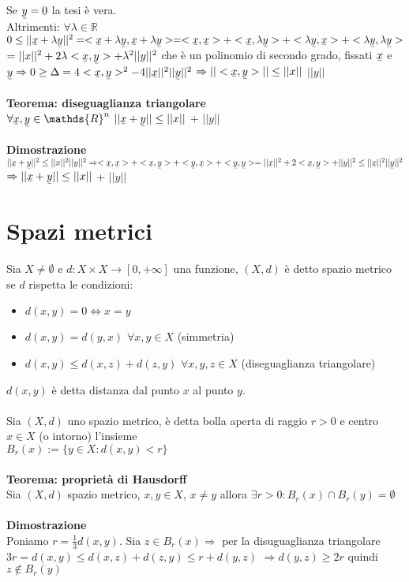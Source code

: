 \documentclass{article}
\newcommand\ubar[1]{\stackunder[1.2pt]{$#1$}{\rule{.8ex}{.075ex}}}
\begin{document}
Se $\ubar{y} = 0$ la tesi è vera.\\
Altrimenti: $\forall \lambda \in \mathds{R}$ \quad $0\leq||\ubar{x}+\lambda\ubar{y}||^2=<\ubar{x}+\lambda\ubar{y},\ubar{x}+\lambda\ubar{y}>=<\ubar{x},\ubar{x}>+<\ubar{x},\lambda\ubar{y}>+<\lambda\ubar{y},\ubar{x}>+<\lambda\ubar{y},\lambda\ubar{y}>$ $=||x||^2+2\lambda<\ubar{x},\ubar{y}>+\lambda^2||y||^2$ che è un polinomio di secondo grado, fissati $\ubar{x}$ e $\ubar{y} \Rightarrow 0 \geq \Delta=4<\ubar{x},\ubar{y}>^2-4||\ubar{x}||^2||\ubar{y}||^2$
$\Rightarrow ||<\ubar{x},\ubar{y}>|| \leq ||x||$ $||y||$\\
\\
\textbf{Teorema: diseguaglianza triangolare}\\
$\forall\ubar{x},\ubar{y}\in\mathds{R}^n$ $||\ubar{x}+\ubar{y}||\leq||x||$ + $||y||$\\\\
\textbf{Dimostrazione}\\
$||\ubar{x}+\ubar{y}||^2\leq||x||^2||y||^2 \Rightarrow <\ubar{x},\ubar{x}>+<\ubar{x},\ubar{y}>+<\ubar{y},\ubar{x}>+<\ubar{y},\ubar{y}>=||\ubar{x}||^2+2<\ubar{x},\ubar{y}>+||y||^2 \leq ||\ubar{x}||^2||\ubar{y}||^2$\\
$\Rightarrow ||\ubar{x}+\ubar{y}||\leq||x||$ + $||y||$

\section{Spazi metrici}
Sia $X\neq\emptyset$ e $d: X\times X\rightarrow[0,+\infty]$ una funzione, $(X,d)$ è detto spazio metrico se $d$ rispetta le condizioni:
\begin{itemize}
    \item $d(x,y)=0 \Leftrightarrow x=y$
    \item $d(x,y)=d(y,x)$ $\forall x,y\in X$ (simmetria)
    \item $d(x,y)\leq d(x,z)+d(z,y)$ $\forall x,y,z\in X$ (diseguaglianza triangolare)
\end{itemize}
$d(x,y)$ è detta distanza dal punto $x$ al punto $y$.\\\\
Sia $(X,d)$ uno spazio metrico, è detta bolla aperta di raggio $r>0$ e centro $x\in X$ (o intorno) l'insieme\\ $B_r(x):=\{y\in X: d(x,y)<r\}$\\\\
\textbf{Teorema: proprietà di Hausdorff}\\
Sia $(X,d)$ spazio metrico, $x,y\in X$, $x\neq y$ allora $\exists r>0: B_r(x)\cap B_r(y)=\emptyset$\\\\
\textbf{Dimostrazione}\\
Poniamo $r=\frac{1}{3}d(x,y)$. Sia $z\in B_r(x)\Rightarrow$ per la disuguaglianza triangolare $3r=d(x,y)\leq d(x,z)+d(z,y)\leq r+d(y,z)$ $\Rightarrow d(y,z)\geq2r$ quindi $z\notin B_r(y)$\\
\end{document}

